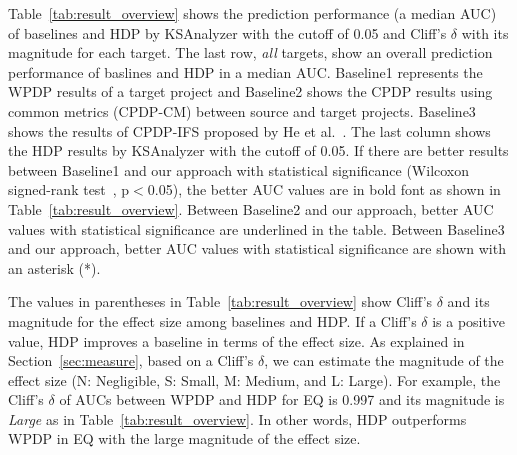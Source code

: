 %


Table~\ref{tab:result_overview} shows the prediction performance (a median AUC)
of baselines and HDP by KSAnalyzer with the cutoff of 0.05 and Cliff's $\delta$ with its magnitude
for each target. The last row, {\em all} targets, show an overall prediction performance of baslines and HDP in a median AUC. Baseline1 represents
the WPDP results of a target project and Baseline2 shows
the CPDP results using common metrics (CPDP-CM) between source and target
projects. Baseline3 shows the results of CPDP-IFS proposed by He et
al.~\cite{He14}. The last column shows the HDP results by KSAnalyzer with the
cutoff of 0.05. If there are better results between Baseline1 and our approach with statistical significance (Wilcoxon signed-rank
test~\cite{Wilcoxon45}, p$<$0.05), the better AUC values are in
bold font as shown in Table~\ref{tab:result_overview}.
Between Baseline2 and our approach, better AUC values with
statistical significance are underlined in
the table. Between Baseline3 and our approach, better AUC values with
statistical significance are shown with an asterisk (*).

The values in parentheses in Table~\ref{tab:result_overview} show Cliff's $\delta$ and its magnitude for the effect size among baselines and HDP. If a Cliff's $\delta$ is a positive value, HDP improves a baseline in terms of the effect size. As explained in Section~\ref{sec:measure}, based on a Cliff's $\delta$, we can estimate the magnitude of the effect size (N: Negligible, S: Small, M: Medium, and L: Large). For example, the Cliff's $\delta$ of AUCs between WPDP and HDP for EQ is 0.997 and its magnitude is {\em Large} as in Table~\ref{tab:result_overview}. In other words, HDP outperforms WPDP in EQ with the large magnitude of the effect size.

